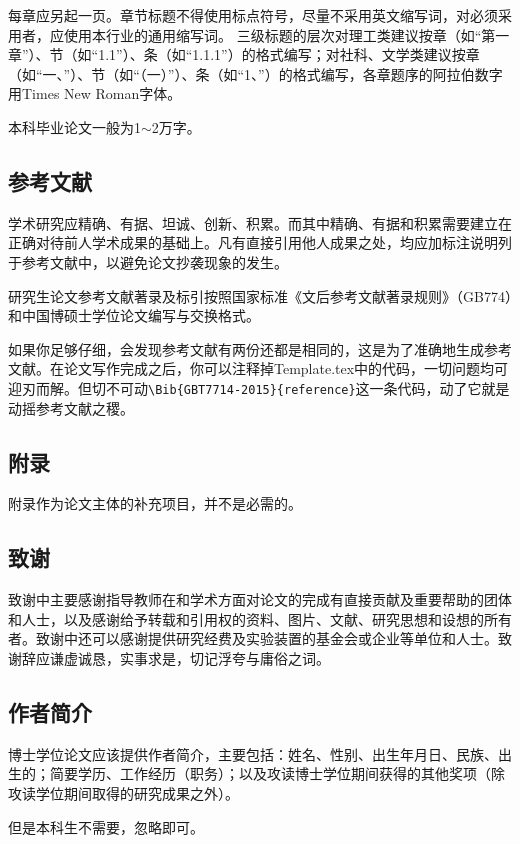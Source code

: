 每章应另起一页。章节标题不得使用标点符号，尽量不采用英文缩写词，对必须采用者，应使用本行业的通用缩写词。
三级标题的层次对理工类建议按章（如“第一章”）、节（如“1.1”）、条（如“1.1.1”）的格式编写；对社科、文学类建议按章（如“一、”）、节（如“（一）”）、条（如“1、”）的格式编写，各章题序的阿拉伯数字用Times New Roman字体。

本科毕业论文一般为1$\sim$2万字。

\subsection{参考文献}

学术研究应精确、有据、坦诚、创新、积累。而其中精确、有据和积累需要建立在正确对待前人学术成果的基础上。凡有直接引用他人成果之处，均应加标注说明列于参考文献中，以避免论文抄袭现象的发生。

研究生论文参考文献著录及标引按照国家标准《文后参考文献著录规则》（GB774）和中国博硕士学位论文编写与交换格式。

如果你足够仔细，会发现参考文献有两份还都是相同的，这是为了准确地生成参考文献。在论文写作完成之后，你可以注释掉Template.tex中的\verb||代码，一切问题均可迎刃而解。但切不可动\verb|\Bib{GBT7714-2015}{reference}|这一条代码，动了它就是动摇参考文献之稷。

\subsection{附录}

附录作为论文主体的补充项目，并不是必需的。

\subsection{致谢}
致谢中主要感谢指导教师在和学术方面对论文的完成有直接贡献及重要帮助的团体和人士，以及感谢给予转载和引用权的资料、图片、文献、研究思想和设想的所有者。致谢中还可以感谢提供研究经费及实验装置的基金会或企业等单位和人士。致谢辞应谦虚诚恳，实事求是，切记浮夸与庸俗之词。

\subsection{作者简介}

博士学位论文应该提供作者简介，主要包括：姓名、性别、出生年月日、民族、出生的；简要学历、工作经历（职务）；以及攻读博士学位期间获得的其他奖项（除攻读学位期间取得的研究成果之外）。

但是本科生不需要，忽略即可。
